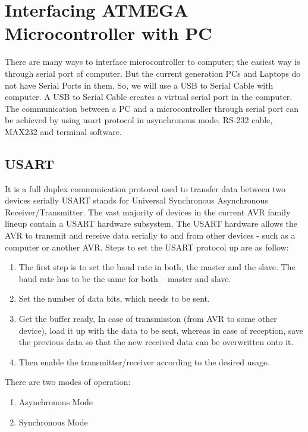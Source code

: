 \documentclass[12pt, a4paper, twoside]{report}
\begin{document}
\section{Interfacing ATMEGA Microcontroller with PC}
There are many ways to interface microcontroller to computer; the easiest way is through serial port of computer. But the current generation PCs and Laptops do not have Serial Ports in them. So, we will use a USB to Serial Cable with computer. A USB to Serial Cable creates a virtual serial port in the computer. The communication between a PC and a microcontroller through serial port can be achieved by using \acrshort{usart} protocol in asynchronous mode, RS-232 cable, MAX232 and terminal software.
\subsection{USART}
It is a full duplex communication protocol used to transfer data between two devices serially USART stands for Universal Synchronous Asynchronous Receiver/Transmitter. The vast majority of devices in the current AVR family lineup contain a USART hardware subsystem. The USART hardware allows the AVR to transmit and receive data serially to and from other devices - such as a computer or another AVR. Steps to set the USART protocol up are as follow:
\begin{enumerate}
\item The first step is to set the baud rate in both, the master and the slave. The baud rate has to be the same for both – master and slave.
\item Set the number of data bits, which needs to be sent.
\item Get the buffer ready, In case of transmission (from AVR to some other device), load it up with the data to be sent, whereas in case of reception, save the previous data so that the new received data can be overwritten onto it.
\item Then enable the transmitter/receiver according to the desired usage.
\end{enumerate}
There are two modes of operation:
\begin{enumerate}
\item Asynchronous Mode 
\item Synchronous Mode
\end{enumerate}
\end{document}
